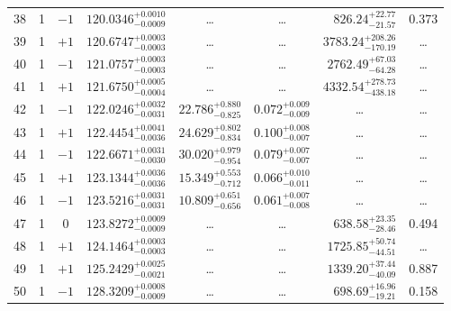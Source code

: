\begin{table*}[!]
\begin{tabular}{llcrrlrc}
38 & 1 & $-1$ & $    120.0346_{-      0.0009}^{+      0.0010}$ & \multicolumn{1}{c}{\dots} & \multicolumn{1}{c}{\dots} & $      826.24_{-       21.57}^{+       22.77}$ & 0.373\\[1pt]
39 & 1 & $+1$ & $    120.6747_{-      0.0003}^{+      0.0003}$ & \multicolumn{1}{c}{\dots} & \multicolumn{1}{c}{\dots} & $     3783.24_{-      170.19}^{+      208.26}$ & \dots\\[1pt]
40 & 1 & $-1$ & $    121.0757_{-      0.0003}^{+      0.0003}$ & \multicolumn{1}{c}{\dots} & \multicolumn{1}{c}{\dots} & $     2762.49_{-       64.28}^{+       67.03}$ & \dots\\[1pt]
41 & 1 & $+1$ & $    121.6750_{-      0.0004}^{+      0.0005}$ & \multicolumn{1}{c}{\dots} & \multicolumn{1}{c}{\dots} & $     4332.54_{-      438.18}^{+      278.73}$ & \dots\\[1pt]
42 & 1 & $-1$ & $    122.0246_{-      0.0031}^{+      0.0032}$ & $      22.786_{-       0.825}^{+       0.880}$ & $       0.072_{-       0.009}^{+       0.009}$ & \multicolumn{1}{c}{\dots} & \dots\\[1pt]
43 & 1 & $+1$ & $    122.4454_{-      0.0036}^{+      0.0041}$ & $      24.629_{-       0.834}^{+       0.802}$ & $       0.100_{-       0.007}^{+       0.008}$ & \multicolumn{1}{c}{\dots} & \dots\\[1pt]
44 & 1 & $-1$ & $    122.6671_{-      0.0030}^{+      0.0031}$ & $      30.020_{-       0.954}^{+       0.979}$ & $       0.079_{-       0.007}^{+       0.007}$ & \multicolumn{1}{c}{\dots} & \dots\\[1pt]
45 & 1 & $+1$ & $    123.1344_{-      0.0036}^{+      0.0036}$ & $      15.349_{-       0.712}^{+       0.553}$ & $       0.066_{-       0.011}^{+       0.010}$ & \multicolumn{1}{c}{\dots} & \dots\\[1pt]
46 & 1 & $-1$ & $    123.5216_{-      0.0031}^{+      0.0031}$ & $      10.809_{-       0.656}^{+       0.651}$ & $       0.061_{-       0.008}^{+       0.007}$ & \multicolumn{1}{c}{\dots} & \dots \\[1pt]
47 & 1 & 0 & $    123.8272_{-      0.0009}^{+      0.0009}$ & \multicolumn{1}{c}{\dots} & \multicolumn{1}{c}{\dots} & $      638.58_{-       28.46}^{+       23.35}$ & 0.494\\[1pt]
48 & 1 & $+1$ & $    124.1464_{-      0.0003}^{+      0.0003}$ & \multicolumn{1}{c}{\dots} & \multicolumn{1}{c}{\dots} & $     1725.85_{-       44.51}^{+       50.74}$ & \dots \\[1pt]
49 & 1 & $+1$ & $    125.2429_{-      0.0021}^{+      0.0025}$ & \multicolumn{1}{c}{\dots} & \multicolumn{1}{c}{\dots} & $     1339.20_{-       40.09}^{+       37.44}$ & 0.887\\[1pt]
50 & 1 & $-1$ & $    128.3209_{-      0.0009}^{+      0.0008}$ & \multicolumn{1}{c}{\dots} & \multicolumn{1}{c}{\dots} & $      698.69_{-       19.21}^{+       16.96}$ & 0.158\\[1pt]
\hline
\end{tabular}
\end{table*}


